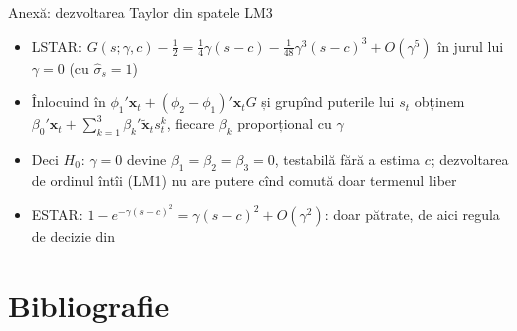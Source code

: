 \begin{frame}{Anexă: dezvoltarea Taylor din spatele LM3}
\hypertarget{atsapp3}{}
\itemsize{\small}
\begin{itemize}
    \item LSTAR: $G(s; \gamma, c) - \tfrac12 = \tfrac14\gamma(s - c) - \tfrac{1}{48}\gamma^3(s - c)^3 + O(\gamma^5)$ în jurul lui $\gamma = 0$ (cu $\hat\sigma_s = 1$)
    \item Înlocuind în $\phi_1'\mathbf x_t + (\phi_2 - \phi_1)'\mathbf x_t G$ și grupînd puterile lui $s_t$ obținem $\beta_0'\mathbf x_t + \sum_{k=1}^3\beta_k'\tilde{\mathbf x}_t s_t^k$, fiecare $\beta_k$ proporțional cu $\gamma$
    \item Deci $H_0$: $\gamma = 0$ devine $\beta_1 = \beta_2 = \beta_3 = 0$, testabilă fără a estima $c$; dezvoltarea de ordinul întîi (LM1) nu are putere cînd comută doar termenul liber 
    \item ESTAR: $1 - e^{-\gamma(s - c)^2} = \gamma(s - c)^2 + O(\gamma^2)$: doar pătrate, de aici regula de decizie din 
\end{itemize}
\end{frame}


\section{Bibliografie}

